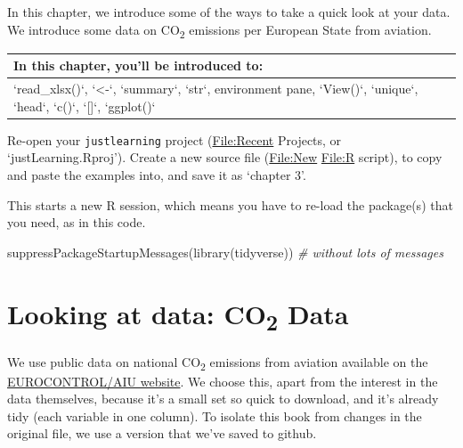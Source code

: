 \documentclass[
]{book}
\newenvironment{Shaded}{\begin{snugshade}}{\end{snugshade}}
\newcommand{\CommentTok}[1]{\textcolor[rgb]{0.56,0.35,0.01}{\textit{#1}}}
\newcommand{\FunctionTok}[1]{\textcolor[rgb]{0.00,0.00,0.00}{#1}}
\newcommand{\NormalTok}[1]{#1}
\begin{document}
In this chapter, we introduce some of the ways to take a quick look at your data. We introduce some data on CO\textsubscript{2} emissions per European State from aviation.

\begin{tabular}{l}
\hline
In this chapter, you'll be introduced to:\\
\hline
`read\_xlsx()`, `<-`, `summary`, `str`, environment pane, `View()`, `unique`, `head`, `c()`, `[]`, `ggplot()`\\
\hline
\end{tabular}

Re-open your \texttt{justlearning} project (\url{File:Recent} Projects, or `justLearning.Rproj'). Create a new source file (\url{File:New} \url{File:R} script), to copy and paste the examples into, and save it as `chapter 3'.

This starts a new R session, which means you have to re-load the package(s) that you need, as in this code.

\begin{Shaded}
\begin{Highlighting}[]
\FunctionTok{suppressPackageStartupMessages}\NormalTok{(}\FunctionTok{library}\NormalTok{(tidyverse)) }\CommentTok{\# without lots of messages }
\end{Highlighting}
\end{Shaded}

\hypertarget{loadco2}{%
\section{\texorpdfstring{Looking at data: CO\textsubscript{2} Data}{Looking at data: CO2 Data}}\label{loadco2}}

We use public data on national CO\textsubscript{2} emissions from aviation available on the \href{https://ansperformance.eu/data/}{EUROCONTROL/AIU website}. We choose this, apart from the interest in the data themselves, because it's a small set so quick to download, and it's already tidy (each variable in one column). To isolate this book from changes in the original file, we use a version that we've saved to github.
\end{document}
